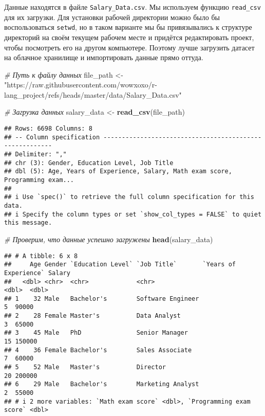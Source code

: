 \documentclass[
]{article}
\newenvironment{Shaded}{\begin{snugshade}}{\end{snugshade}}
\newcommand{\CommentTok}[1]{\textcolor[rgb]{0.56,0.35,0.01}{\textit{#1}}}
\newcommand{\FunctionTok}[1]{\textcolor[rgb]{0.13,0.29,0.53}{\textbf{#1}}}
\newcommand{\NormalTok}[1]{#1}
\newcommand{\OtherTok}[1]{\textcolor[rgb]{0.56,0.35,0.01}{#1}}
\newcommand{\StringTok}[1]{\textcolor[rgb]{0.31,0.60,0.02}{#1}}
\begin{document}
Данные находятся в файле \texttt{Salary\_Data.csv}. Мы используем
функцию \texttt{read\_csv} для их загрузки. Для установки рабочей
директории можно было бы воспользоваться \texttt{setwd}, но в таком
варианте мы бы привязывались к структуре директорий на своём текущем
рабочем месте и придётся редактировать проект, чтобы посмотреть его на
другом компьютере. Поэтому лучше загрузить датасет на облачное хранилище
и импортировать данные прямо оттуда.

\begin{Shaded}
\begin{Highlighting}[]
\CommentTok{\# Путь к файлу данных}
\NormalTok{file\_path }\OtherTok{\textless{}{-}} \StringTok{"https://raw.githubusercontent.com/wowxoxo/r{-}lang\_project/refs/heads/master/data/Salary\_Data.csv"}

\CommentTok{\# Загрузка данных}
\NormalTok{salary\_data }\OtherTok{\textless{}{-}} \FunctionTok{read\_csv}\NormalTok{(file\_path)}
\end{Highlighting}
\end{Shaded}

\begin{verbatim}
## Rows: 6698 Columns: 8
## -- Column specification --------------------------------------------------------
## Delimiter: ","
## chr (3): Gender, Education Level, Job Title
## dbl (5): Age, Years of Experience, Salary, Math exam score, Programming exam...
## 
## i Use `spec()` to retrieve the full column specification for this data.
## i Specify the column types or set `show_col_types = FALSE` to quiet this message.
\end{verbatim}

\begin{Shaded}
\begin{Highlighting}[]
\CommentTok{\# Проверим, что данные успешно загружены}
\FunctionTok{head}\NormalTok{(salary\_data)}
\end{Highlighting}
\end{Shaded}

\begin{verbatim}
## # A tibble: 6 x 8
##     Age Gender `Education Level` `Job Title`       `Years of Experience` Salary
##   <dbl> <chr>  <chr>             <chr>                             <dbl>  <dbl>
## 1    32 Male   Bachelor's        Software Engineer                     5  90000
## 2    28 Female Master's          Data Analyst                          3  65000
## 3    45 Male   PhD               Senior Manager                       15 150000
## 4    36 Female Bachelor's        Sales Associate                       7  60000
## 5    52 Male   Master's          Director                             20 200000
## 6    29 Male   Bachelor's        Marketing Analyst                     2  55000
## # i 2 more variables: `Math exam score` <dbl>, `Programming exam score` <dbl>
\end{verbatim}
\end{document}
